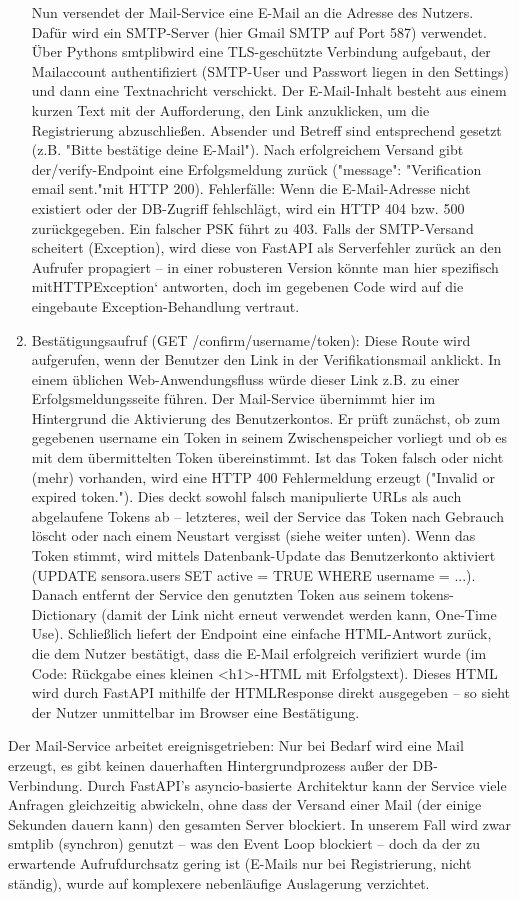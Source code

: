 \begin{enumerate}
    Nun versendet der Mail-Service eine E-Mail an die Adresse des Nutzers. Dafür wird ein SMTP-Server (hier Gmail SMTP auf Port 587) verwendet. Über Pythons smtplibwird eine TLS-geschützte Verbindung aufgebaut, der Mailaccount authentifiziert (SMTP-User und Passwort liegen in den Settings) und dann eine Textnachricht verschickt. Der E-Mail-Inhalt besteht aus einem kurzen Text mit der Aufforderung, den Link anzuklicken, um die Registrierung abzuschließen. Absender und Betreff sind entsprechend gesetzt (z.B. "Bitte bestätige deine E-Mail"). Nach erfolgreichem Versand gibt der/verify-Endpoint eine Erfolgsmeldung zurück ({"message": "Verification email sent."}mit HTTP 200). Fehlerfälle:
    Wenn die E-Mail-Adresse nicht existiert oder der DB-Zugriff fehlschlägt, wird ein HTTP 404 bzw. 500 zurückgegeben. Ein falscher PSK führt zu 403. Falls der SMTP-Versand scheitert (Exception), wird diese von FastAPI als Serverfehler zurück an den Aufrufer propagiert – in einer robusteren Version könnte man hier spezifisch mitHTTPException` antworten, doch im gegebenen Code wird auf die eingebaute Exception-Behandlung vertraut.
    \item Bestätigungsaufruf (GET /confirm/{username}/{token}): Diese Route wird aufgerufen, wenn der Benutzer den Link in der Verifikationsmail anklickt. In einem üblichen Web-Anwendungsfluss würde dieser Link z.B. zu einer Erfolgsmeldungsseite führen. Der Mail-Service übernimmt hier im Hintergrund die Aktivierung des Benutzerkontos. Er prüft zunächst, ob zum gegebenen username ein Token in seinem Zwischenspeicher vorliegt und ob es mit dem übermittelten Token übereinstimmt. Ist das Token falsch oder nicht (mehr) vorhanden, wird eine HTTP 400 Fehlermeldung erzeugt ("Invalid or expired token."). Dies deckt sowohl falsch manipulierte URLs als auch abgelaufene Tokens ab – letzteres, weil der Service das Token nach Gebrauch löscht oder nach einem Neustart vergisst (siehe weiter unten). Wenn das Token stimmt, wird mittels Datenbank-Update das Benutzerkonto aktiviert (UPDATE sensora.users SET active = TRUE WHERE username = ...). Danach entfernt der Service den genutzten Token aus seinem tokens-Dictionary (damit der Link nicht erneut verwendet werden kann, One-Time Use). Schließlich liefert der Endpoint eine einfache HTML-Antwort zurück, die dem Nutzer bestätigt, dass die E-Mail erfolgreich verifiziert wurde (im Code: Rückgabe eines kleinen <h1>-HTML mit Erfolgstext). Dieses HTML wird durch FastAPI mithilfe der HTMLResponse direkt ausgegeben – so sieht der Nutzer unmittelbar im Browser eine Bestätigung.
\end{enumerate}
Der Mail-Service arbeitet ereignisgetrieben: Nur bei Bedarf wird eine Mail erzeugt, es gibt keinen dauerhaften Hintergrundprozess außer der DB-Verbindung. Durch FastAPI’s asyncio-basierte Architektur \cite{fastAPI}kann der Service viele Anfragen gleichzeitig abwickeln, ohne dass der Versand einer Mail (der einige Sekunden dauern kann) den gesamten Server blockiert. In unserem Fall wird zwar smtplib (synchron) genutzt – was den Event Loop blockiert – doch da der zu erwartende Aufrufdurchsatz gering ist (E-Mails nur bei Registrierung, nicht ständig), wurde auf komplexere nebenläufige Auslagerung verzichtet.

